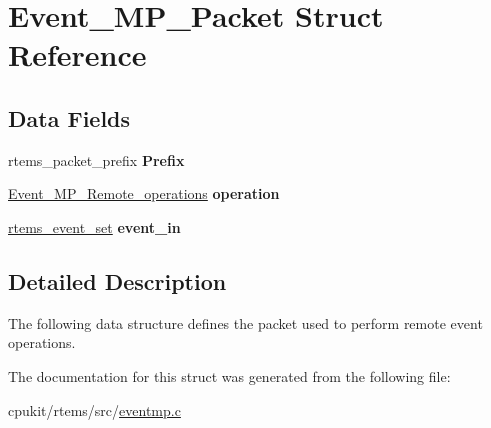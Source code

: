\hypertarget{structEvent__MP__Packet}{}\section{Event\+\_\+\+M\+P\+\_\+\+Packet Struct Reference}
\label{structEvent__MP__Packet}
\subsection*{Data Fields}
\begin{DoxyCompactItemize}
\item 
\mbox{\label{structEvent__MP__Packet_ae410e7709e54ffe9b79e5d8c9629da65}} 
rtems\+\_\+packet\+\_\+prefix {\bfseries Prefix}
\item 
\mbox{\label{structEvent__MP__Packet_a707ca3b526cd48b155783c19f1f76d9e}} 
\mbox{\hyperlink{eventmp_8c_a09d5af6ceabda99fddf414c9a8273da8}{Event\+\_\+\+M\+P\+\_\+\+Remote\+\_\+operations}} {\bfseries operation}
\item 
\mbox{\label{structEvent__MP__Packet_aaab8a06d791090dfed2a8117d15c5b22}} 
\mbox{\hyperlink{group__ClassicEventSet_gab7b8f373bea85fd4e3b7ae23905faa07}{rtems\+\_\+event\+\_\+set}} {\bfseries event\+\_\+in}
\end{DoxyCompactItemize}


\subsection{Detailed Description}
The following data structure defines the packet used to perform remote event operations. 

The documentation for this struct was generated from the following file\+:\begin{DoxyCompactItemize}
\item 
cpukit/rtems/src/\mbox{\hyperlink{eventmp_8c}{eventmp.\+c}}\end{DoxyCompactItemize}
